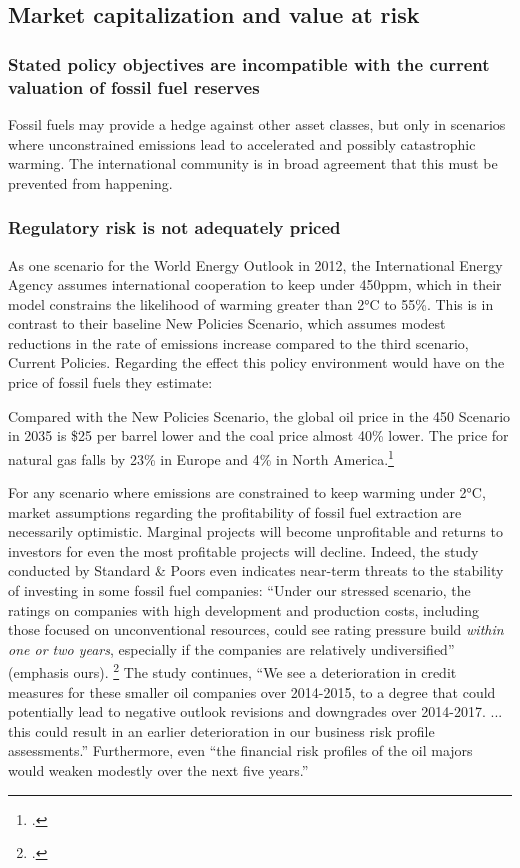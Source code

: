 \subsection {Market capitalization and value at risk}

\subsubsection {Stated policy objectives are incompatible with the current valuation of fossil fuel reserves}

Fossil fuels may provide a hedge against other asset classes, but only in scenarios where unconstrained emissions lead to accelerated and possibly catastrophic warming. 
The international community is in broad agreement that this must be prevented from happening.




\subsubsection {Regulatory risk is not adequately priced} 



As one scenario for the World Energy Outlook in 2012, the International Energy Agency assumes international cooperation to keep  under 450ppm, which in their model constrains the likelihood of warming greater than 2°C to 55\%. 
This is in contrast to their baseline New Policies Scenario, which assumes modest reductions in the rate of emissions increase compared to the third scenario, Current Policies. 
Regarding the effect this policy environment would have on the price of fossil fuels they estimate:
\begin{slquote}Compared with the New Policies Scenario, the global oil price in the 450 Scenario in 2035 is \$25 per barrel lower and the coal price almost 40\% lower. The price for natural gas falls by 23\% in Europe and 4\% in North America.\footcite[][p. 257]{IEA2012}
\end{slquote}

For any scenario where emissions are constrained to keep warming under 2°C, market assumptions regarding the profitability of fossil fuel extraction are necessarily optimistic. 
Marginal projects will become unprofitable and returns to investors for even the most profitable projects will decline. 
Indeed, the study conducted by Standard \& Poors even indicates near-term threats to the stability of investing in some fossil fuel companies:
  ``Under our stressed scenario, the ratings on companies with high development and production costs, including those focused on unconventional resources, could see rating pressure build \emph{within one or two years}, especially if the companies are relatively undiversified'' (emphasis ours). \footcite{SandPConstrained}
  The study continues, ``We see a deterioration in credit measures for these smaller oil companies over 2014-2015, to a degree that could potentially lead to negative outlook revisions and downgrades over 2014-2017. ... this could result in an earlier deterioration in our business risk profile assessments.''
  Furthermore, even ``the financial risk profiles of the oil majors would weaken modestly over the next five years.''
  
